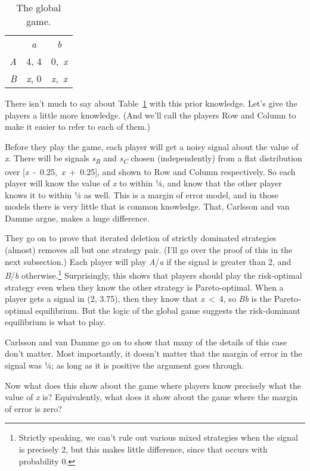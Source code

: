 \documentclass[
  10pt,
  letterpaper,
  twoside]{scrbook}
\begin{document}
\begin{longtable}[]{@{}rcc@{}}
\caption{The global game.}\label{tbl-global-game}\tabularnewline
\toprule\noalign{}
\endfirsthead
\endhead
\bottomrule\noalign{}
\endlastfoot
& \emph{a} & \emph{b} \\
\emph{A} & 4, 4 & 0,~\emph{x} \\
\emph{B} & \emph{x}, 0 & \emph{x},~\emph{x} \\
\end{longtable}

There isn't much to say about Table~\ref{tbl-global-game} with this
prior knowledge. Let's give the players a little more knowledge. (And
we'll call the players Row and Column to make it easier to refer to each
of them.)

Before they play the game, each player will get a noisy signal about the
value of \emph{x}. There will be signals \emph{s\textsubscript{R}} and
\emph{s\textsubscript{C}} chosen (independently) from a flat
distribution over {[}\emph{x}~-~0.25,~\emph{x}~+~0.25{]}, and shown to
Row and Column respectively. So each player will know the value of
\emph{x} to within ¼, and know that the other player knows it to within
¼ as well. This is a margin of error model, and in those models there is
very little that is common knowledge. That, Carlsson and van Damme
argue, makes a huge difference.

They go on to prove that iterated deletion of strictly dominated
strategies (almost) removes all but one strategy pair. (I'll go over the
proof of this in the next subsection.) Each player will play
\emph{A}/\emph{a} if the signal is greater than 2, and \emph{B}/\emph{b}
otherwise.\footnote{Strictly speaking, we can't rule out various mixed
  strategies when the signal is precisely 2, but this makes little
  difference, since that occurs with probability 0.} Surprisingly, this
shows that players should play the risk-optimal strategy even when they
know the other strategy is Pareto-optimal. When a player gets a signal
in (2, 3.75), then they know that \emph{x}~\textless~4, so \emph{Bb} is
the Pareto-optimal equilibrium. But the logic of the global game
suggests the risk-dominant equilibrium is what to play.

Carlsson and van Damme go on to show that many of the details of this
case don't matter. Most importantly, it doesn't matter that the margin
of error in the signal was ¼; as long as it is positive the argument
goes through.

Now what does this show about the game where players know precisely what
the value of \emph{x} is? Equivalently, what does it show about the game
where the margin of error is zero?
\end{document}
